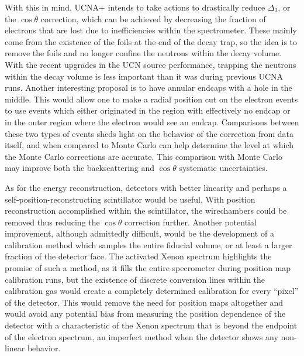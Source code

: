 With this in mind, UCNA$+$ intends to take actions to drastically reduce
$\Delta_3$, or the $\cos\theta$ correction, which can be achieved by decreasing the fraction
of electrons that are lost due to inefficiencies within the spectrometer. These mainly come from
the existence of the foils at the end of the decay trap, so the idea is to remove the foils and no longer
confine the neutrons within the decay volume. With
the recent upgrades in the UCN source performance, trapping the neutrons within the decay volume is
less important than it was during previous UCNA runs. Another interesting proposal is to have annular
endcaps with a hole in the middle. This would allow one to make a radial position cut on the electron
events to use events which either originated in the region with effectively no endcap or in the outer
region where the electron would see an endcap. Comparisons between these two types of events sheds
light on the behavior of the correction from data itself, and when compared to Monte Carlo can help
determine the level at which the Monte Carlo corrections are accurate. This comparison with Monte Carlo
may improve both the backscattering and $\cos\theta$ systematic uncertainties.

As for the energy reconstruction, detectors with better linearity and perhaps a
self-position-reconstructing scintillator would be useful. With position reconstruction accomplished
within the scintillator, the wirechambers could be removed thus reducing the $\cos\theta$ correction
further. Another potential improvement, although admittedly difficult,
would be the development of a calibration method
which samples the entire fiducial volume, or at least a larger fraction of the detector face. The activated
Xenon spectrum highlights the promise of such a method, as it fills the entire specrometer during position
map calibration runs, but the existence of discrete conversion lines within the calibration gas would create
a completely determined calibration for every ``pixel'' of the detector. This would remove the need for position
maps altogether and would avoid any
potential bias from measuring the position dependence of the detector with a characteristic of the Xenon
spectrum that is beyond the endpoint of the electron spectrum, an imperfect method when the detector
shows any non-linear behavior.

